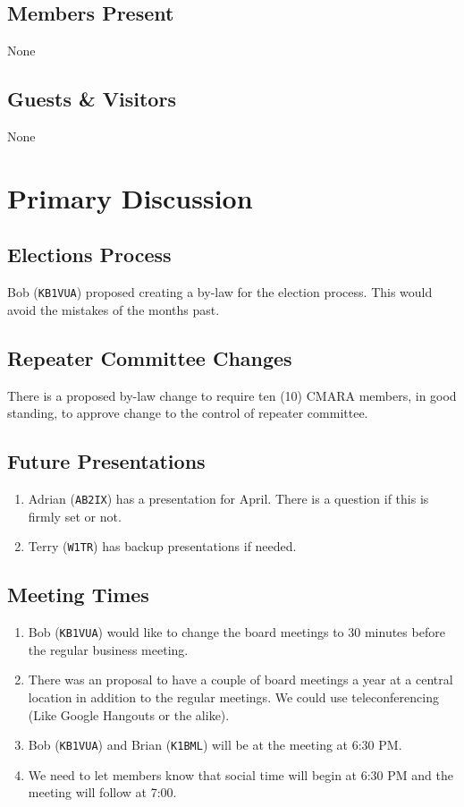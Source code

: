 \documentclass[10pt,letterpaper]{article}
\begin{document}
\subsection{Members Present}

None

\subsection{Guests \& Visitors}

None

\section{Primary Discussion}

\subsection{Elections Process}
Bob (\texttt{KB1VUA}) proposed creating a by-law for the election process. This would avoid the mistakes of the months past.

\subsection{Repeater Committee Changes}
There is a proposed by-law change to require ten (10) CMARA members, in good standing, to approve change to the control of repeater committee.

\subsection{Future Presentations}
\begin{enumerate}
  \item Adrian (\texttt{AB2IX}) has a presentation for April. There is a question if this is firmly set or not.
  \item Terry (\texttt{W1TR}) has backup presentations if needed.
\end{enumerate}

\subsection{Meeting Times}
\begin{enumerate}
\item Bob (\texttt{KB1VUA}) would like to change the board meetings to 30 minutes before the regular business meeting.
\item There was an proposal to have a couple of board meetings a year at a central location in addition to the regular meetings. We could use teleconferencing (Like Google Hangouts or the alike).
\item Bob (\texttt{KB1VUA}) and Brian (\texttt{K1BML}) will be at the meeting at 6:30 PM.
\item We need to let members know that social time will begin at 6:30 PM and the meeting will follow at 7:00.
\end{enumerate}
\end{document}
